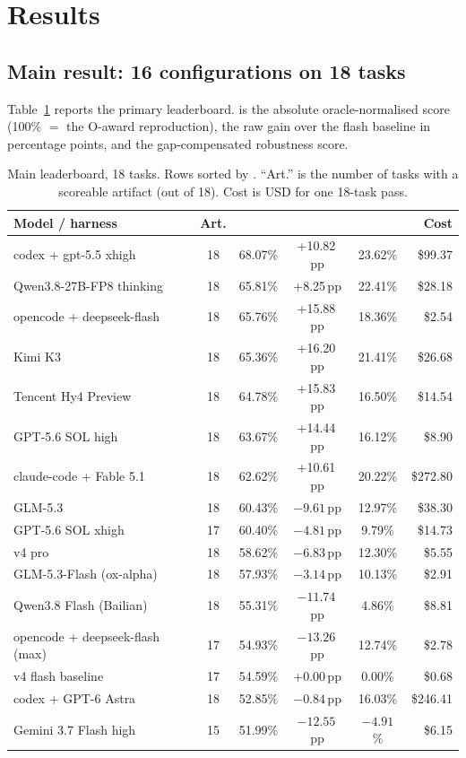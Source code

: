 \section{Results}
\label{sec:results}

\subsection{Main result: 16 configurations on 18 tasks}
Table~\ref{tab:main} reports the primary leaderboard. \oeval{} is the absolute oracle-normalised score (100\% $=$ the O-award reproduction), \beval{} the raw gain over the flash baseline in percentage points, and \roeval{} the gap-compensated robustness score.

\begin{table}[t]
\centering
\small
\caption{Main leaderboard, 18 tasks. Rows sorted by \oeval{}. ``Art.'' is the number of tasks with a scoreable artifact (out of 18). Cost is USD for one 18-task pass.}
\label{tab:main}
\begin{tabular}{@{}lccccr@{}}
\toprule
Model / harness & Art. & \oeval{} & \beval{} & \roeval{} & Cost \\
\midrule
codex + gpt-5.5 xhigh          & 18 & 68.07\% & +10.82\,pp & 23.62\% & \$99.37 \\
Qwen3.8-27B-FP8 thinking       & 18 & 65.81\% & +8.25\,pp  & 22.41\% & \$28.18 \\
opencode + deepseek-flash      & 18 & 65.76\% & +15.88\,pp & 18.36\% & \$2.54 \\
Kimi K3                        & 18 & 65.36\% & +16.20\,pp & 21.41\% & \$26.68 \\
Tencent Hy4 Preview            & 18 & 64.78\% & +15.83\,pp & 16.50\% & \$14.54 \\
GPT-5.6 SOL high               & 18 & 63.67\% & +14.44\,pp & 16.12\% & \$8.90 \\
claude-code + Fable 5.1        & 18 & 62.62\% & +10.61\,pp & 20.22\% & \$272.80 \\
GLM-5.3                        & 18 & 60.43\% & $-9.61$\,pp & 12.97\% & \$38.30 \\
GPT-5.6 SOL xhigh              & 17 & 60.40\% & $-4.81$\,pp & 9.79\%  & \$14.73 \\
v4 pro                         & 18 & 58.62\% & $-6.83$\,pp & 12.30\% & \$5.55 \\
GLM-5.3-Flash (ox-alpha)       & 18 & 57.93\% & $-3.14$\,pp & 10.13\% & \$2.91 \\
Qwen3.8 Flash (Bailian)        & 18 & 55.31\% & $-11.74$\,pp & 4.86\% & \$8.81 \\
opencode + deepseek-flash (max)& 17 & 54.93\% & $-13.26$\,pp & 12.74\% & \$2.78 \\
v4 flash baseline              & 17 & 54.59\% & +0.00\,pp & 0.00\% & \$0.68 \\
codex + GPT-6 Astra            & 18 & 52.85\% & $-0.84$\,pp & 16.03\% & \$246.41 \\
Gemini 3.7 Flash high          & 15 & 51.99\% & $-12.55$\,pp & $-4.91$\% & \$6.15 \\
\bottomrule
\end{tabular}
\end{table}

